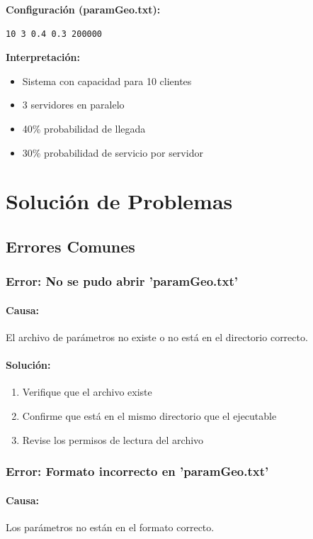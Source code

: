 \documentclass{article}
\begin{document}
\textbf{Configuración (paramGeo.txt):}
\begin{lstlisting}
10 3 0.4 0.3 200000
\end{lstlisting}

\textbf{Interpretación:}
\begin{itemize}
    \item Sistema con capacidad para 10 clientes
    \item 3 servidores en paralelo
    \item 40\% probabilidad de llegada
    \item 30\% probabilidad de servicio por servidor
\end{itemize}

\section{Solución de Problemas}

\subsection{Errores Comunes}

\subsubsection{Error: No se pudo abrir 'paramGeo.txt'}
\paragraph{Causa:} El archivo de parámetros no existe o no está en el directorio correcto.

\paragraph{Solución:} 
\begin{enumerate}
    \item Verifique que el archivo existe
    \item Confirme que está en el mismo directorio que el ejecutable
    \item Revise los permisos de lectura del archivo
\end{enumerate}

\subsubsection{Error: Formato incorrecto en 'paramGeo.txt'}
\paragraph{Causa:} Los parámetros no están en el formato correcto.
\end{document}
